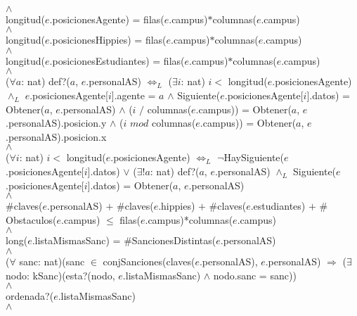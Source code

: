 {	\\
	$\land$
	\\%
	longitud($e$.posicionesAgente) = filas($e$.campus)$*$columnas($e$.campus)
	\\
	$\land$
	\\%
	longitud($e$.posicionesHippies) = filas($e$.campus)$*$columnas($e$.campus)
	\\
	$\land$
	\\%
	longitud($e$.posicionesEstudiantes) = filas($e$.campus)$*$columnas($e$.campus)
	\\
	$\land$
	\\%
	($\forall a$: nat) def?($a$, $e$.personalAS) $\Leftrightarrow_L$ ($\exists i$: nat) $i <$ longitud($e$.posicionesAgente) $\land_L$ $e$.posicionesAgente[$i$].agente = $a$ $\land$ Siguiente($e$.posicionesAgente[$i$].datos) = Obtener($a$, $e$.personalAS) $\land$ ($i$ $/$ columnas($e$.campus)) = Obtener($a$, $e$.personalAS).posicion.y $\land$ ($i$ $mod$ columnas($e$.campus)) = Obtener($a$, $e$.personalAS).posicion.x
	\\
	$\land$
	\\%
	($\forall i$: nat) $i <$ longitud($e$.posicionesAgente) $\Leftrightarrow_L$ $\neg$HaySiguiente($e$.posicionesAgente[$i$].datos) $\lor$ ($\exists! a$: nat) def?($a$, $e$.personalAS) $\land_L$ Siguiente($e$.posicionesAgente[$i$].datos) = Obtener($a$, $e$.personalAS)
	\\
	$\land$
	\\%
	$\#$claves($e$.personalAS) $+$ $\#$claves($e$.hippies) $+$ $\#$claves($e$.estudiantes) $+$ $\#$Obstaculos($e$.campus) $\leq$ filas($e$.campus)*columnas($e$.campus)
	\\
	$\land$
	\\%
	long($e$.listaMismasSanc) = $\#$SancionesDistintas($e$.personalAS)
	\\
	$\land$
	\\%
	($\forall$ sanc: nat)(sanc $\in$ conjSanciones(claves($e$.personalAS), $e$.personalAS) $\Rightarrow$ ($\exists$ nodo: kSanc)(esta?(nodo, $e$.listaMismasSanc) $\land$ nodo.sanc = sanc))
	\\
	$\land$
	\\%
	ordenada?($e$.listaMismasSanc)
	\\
}\mbox{} %
	$\land$
	\\%
